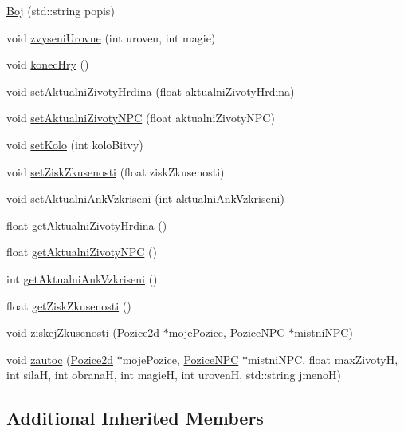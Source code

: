 \begin{DoxyCompactItemize}
\item 
\hyperlink{class_boj_a1238a812508e29c01ad088f3b7d84e56}{Boj} (std\-::string popis)
\item 
void \hyperlink{class_boj_a82ec663b877ba2bca5b3760f44870490}{zvyseni\-Urovne} (int uroven, int magie)
\item 
void \hyperlink{class_boj_a214cdbe6d7c12eac0b99881bb456bd32}{konec\-Hry} ()
\item 
void \hyperlink{class_boj_a08c2242243af723997ba1973c0a4d518}{set\-Aktualni\-Zivoty\-Hrdina} (float aktualni\-Zivoty\-Hrdina)
\item 
void \hyperlink{class_boj_a939d43165cb303faa26e2e9cee6c3048}{set\-Aktualni\-Zivoty\-N\-P\-C} (float aktualni\-Zivoty\-N\-P\-C)
\item 
void \hyperlink{class_boj_aeade8c851c9b5dfbbc42a27c95c70560}{set\-Kolo} (int kolo\-Bitvy)
\item 
void \hyperlink{class_boj_a91afe36bbc33874f70f3102f5d616ddd}{set\-Zisk\-Zkusenosti} (float zisk\-Zkusenosti)
\item 
void \hyperlink{class_boj_a48e4335781b5bec7c55ccab8aee6a328}{set\-Aktualni\-Ank\-Vzkriseni} (int aktualni\-Ank\-Vzkriseni)
\item 
float \hyperlink{class_boj_ac687348f6a982c860394fafb5d719171}{get\-Aktualni\-Zivoty\-Hrdina} ()
\item 
float \hyperlink{class_boj_a88d7f3f8c2bcad95d9ab4dc7f9c4b53f}{get\-Aktualni\-Zivoty\-N\-P\-C} ()
\item 
int \hyperlink{class_boj_adac217a4d30b5f4779389fb36469889e}{get\-Aktualni\-Ank\-Vzkriseni} ()
\item 
float \hyperlink{class_boj_ae3e26d29b461bc5c2b0ccc75775cafcb}{get\-Zisk\-Zkusenosti} ()
\item 
void \hyperlink{class_boj_aa72d5bc107c72076c2b78fa03b1d6304}{ziskej\-Zkusenosti} (\hyperlink{struct_pozice2d}{Pozice2d} $\ast$moje\-Pozice, \hyperlink{class_pozice_n_p_c}{Pozice\-N\-P\-C} $\ast$mistni\-N\-P\-C)
\item 
void \hyperlink{class_boj_a94616ab70c4bf63aa9e4c1e40a6d3961}{zautoc} (\hyperlink{struct_pozice2d}{Pozice2d} $\ast$moje\-Pozice, \hyperlink{class_pozice_n_p_c}{Pozice\-N\-P\-C} $\ast$mistni\-N\-P\-C, float max\-Zivoty\-H, int sila\-H, int obrana\-H, int magie\-H, int uroven\-H, std\-::string jmeno\-H)
\end{DoxyCompactItemize}
\subsection*{Additional Inherited Members}


